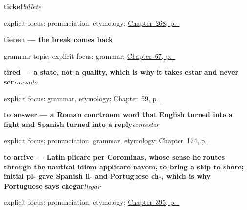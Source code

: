 \noindent\begin{minipage}[t]{\linewidth}
\raggedright
\textbf{ticket}\enspace\emph{billete}\par
\footnotesize explicit focus: pronunciation, etymology; \hyperref[ch:viajar]{Chapter~268, p.~\pageref*{ch:viajar}}
\end{minipage}\par\smallskip

\noindent\begin{minipage}[t]{\linewidth}
\raggedright
\textbf{tienen — the break comes back}\par
\footnotesize grammar topic; explicit focus: grammar; \hyperref[ch:spanish-tener-plural]{Chapter~67, p.~\pageref*{ch:spanish-tener-plural}}
\end{minipage}\par\smallskip

\noindent\begin{minipage}[t]{\linewidth}
\raggedright
\textbf{tired — a state, not a quality, which is why it takes estar and never ser}\enspace\emph{cansado}\par
\footnotesize explicit focus: grammar, etymology; \hyperref[ch:cansado]{Chapter~59, p.~\pageref*{ch:cansado}}
\end{minipage}\par\smallskip

\noindent\begin{minipage}[t]{\linewidth}
\raggedright
\textbf{to answer — a Roman courtroom word that English turned into a fight and Spanish turned into a reply}\enspace\emph{contestar}\par
\footnotesize explicit focus: pronunciation, grammar, etymology; \hyperref[ch:spanish-wait-answer-buy]{Chapter~174, p.~\pageref*{ch:spanish-wait-answer-buy}}
\end{minipage}\par\smallskip

\noindent\begin{minipage}[t]{\linewidth}
\raggedright
\textbf{to arrive — Latin plicāre per Corominas, whose sense he routes through the nautical idiom applicāre nāvem, to bring a ship to shore; initial pl- gave Spanish ll- and Portuguese ch-, which is why Portuguese says chegar}\enspace\emph{llegar}\par
\footnotesize explicit focus: pronunciation, etymology; \hyperref[ch:entrar-y-volver]{Chapter~395, p.~\pageref*{ch:entrar-y-volver}}
\end{minipage}\par\smallskip

